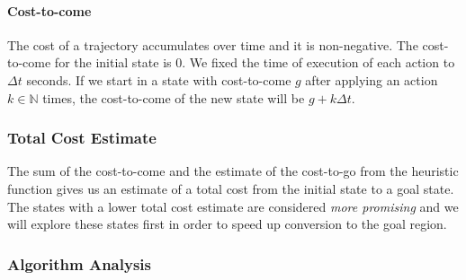 \paragraph{Cost-to-come} The cost of a trajectory accumulates over time and it is non-negative. The cost-to-come for the initial state is $0$. We fixed the time of execution of each action to $\Delta t$ seconds. If we start in a state with cost-to-come $g$ after applying an action $k\in \mathbb{N}$ times, the cost-to-come of the new state will be $g+k\Delta t$.

\subsubsection{Total Cost Estimate} The sum of the cost-to-come and the estimate of the cost-to-go from the heuristic function gives us an estimate of a total cost from the initial state to a goal state. The states with a lower total cost estimate are considered \textit{more promising} and we will explore these states first in order to speed up conversion to the goal region.

\subsubsection{Algorithm Analysis}

